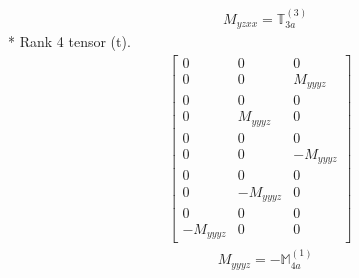 \documentclass[fleqn,8pt,landscape]{jsarticle}
\begin{document}
\begin{align*}
& M_{yzxx} = \mathbb{T}_{3a}^{(3)}
\end{align*}
* Rank 4 tensor (t).
\begin{align*}
\begin{bmatrix} 0 & 0 & 0 \\ 0 & 0 & M_{yyyz} \\ 0 & 0 & 0 \\ 0 & M_{yyyz} & 0 \\ 0 & 0 & 0 \\ 0 & 0 & - M_{yyyz} \\ 0 & 0 & 0 \\ 0 & - M_{yyyz} & 0 \\ 0 & 0 & 0 \\ - M_{yyyz} & 0 & 0 \end{bmatrix}
\end{align*}
\begin{align*}
& M_{yyyz} = - \mathbb{M}_{4a}^{(1)}
\end{align*}
\end{document}
